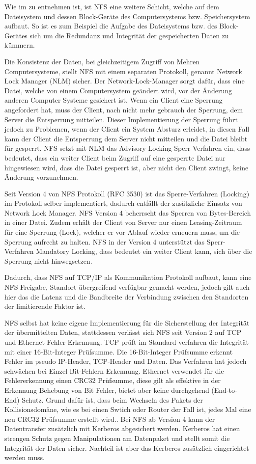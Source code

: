 Wie im  zu entnehmen ist, ist NFS eine weitere Schicht, welche auf dem Dateisystem und dessen Block-Geräte des Computersystems bzw. Speichersystem aufbaut. So ist es zum Beispiel die Aufgabe des Dateisystems bzw. des Block-Gerätes sich um die Redundanz und Integrität der gespeicherten Daten zu kümmern. 

Die Konsistenz der Daten, bei gleichzeitigem Zugriff von Mehren Computersysteme, stellt NFS mit einem separaten Protokoll, genannt Network Lock Manager (NLM) sicher. Der Network-Lock-Manager sorgt dafür, dass eine Datei, welche von einem Computersystem geändert wird, vor der Änderung anderen Computer Systeme gesichert ist. Wenn ein Client eine Sperrung angefordert hat, muss der Client, nach nicht mehr gebrauch der Sperrung, dem Server die Entsperrung mitteilen. Dieser Implementierung der Sperrung führt jedoch zu Problemen, wenn der Client ein System Absturz erleidet, in diesen Fall kann der Client die Entsperrung dem Server nicht mitteilen und die Datei bleibt für gesperrt.
NFS setzt mit NLM das Advisory Locking Sperr-Verfahren ein, dass bedeutet, dass ein weiter Client beim Zugriff auf eine gesperrte Datei nur hingewiesen wird, dass die Datei gesperrt ist, aber nicht den Client zwingt, keine Änderung vorzunehmen.\cite{Stern2001}


Seit Version 4 von NFS Protokoll (RFC 3530) ist das Sperre-Verfahren (Locking) im Protokoll selber implementiert, dadurch entfällt der zusätzliche Einsatz von Network Lock Manager. NFS Version 4 beherrscht das Sperren von Bytes-Bereich in einer Datei. Zudem erhält der Client von Server nur einen Leasing-Zeitraum für eine Sperrung (Lock), welcher er vor Ablauf wieder erneuern muss, um die Sperrung aufrecht zu halten. NFS in der Version 4 unterstützt das Sperr-Verfahren Mandatory Locking, dass bedeutet ein weiter Client kann, sich über die Sperrung nicht hinwegsetzen.\cite{Callaghan2003}

Dadurch, dass NFS auf TCP/IP als Kommunikation Protokoll aufbaut, kann eine NFS Freigabe, Standort übergreifend verfügbar gemacht werden, jedoch gilt auch hier das die Latenz und die Bandbreite der Verbindung zwischen den Standorten der limitierende Faktor ist.

NFS selbst hat keine eigene Implementierung für die Sicherstellung der Integrität der übermittelten Daten, stattdessen verlässt sich NFS seit Version 2 auf TCP und Ethernet Fehler Erkennung. TCP prüft im Standard verfahren die Integrität mit einer 16-Bit-Integer Prüfsumme. Die 16-Bit-Integer Prüfsumme erkennt Fehler im pseudo IP-Header, TCP-Header und Daten. Das Verfahren hat jedoch schwächen bei Einzel Bit-Fehlern Erkennung. Ethernet verwendet für die Fehlererkennung einen CRC32 Prüfsumme, diese gilt als effektive in der Erkennung Behebung von Bit Fehler, bietet aber keine durchgehend (End-to-End) Schutz. Grund dafür ist, dass beim Wechseln des Pakets der Kollisionsdomäne, wie es bei einen Swtich oder Router der Fall ist, jedes Mal eine neu CRC32 Prüfsumme erstellt wird.\cite{JohnL.202}. Bei NFS ab Version 4 kann der Datentransfer zusätzlich mit Kerberos abgesichert werden. Kerberos hat einen strengen Schutz gegen Manipulationen am Datenpaket und stellt somit die Integrität der Daten sicher. Nachteil ist aber das Kerberos zusätzlich eingerichtet werden muss. 

